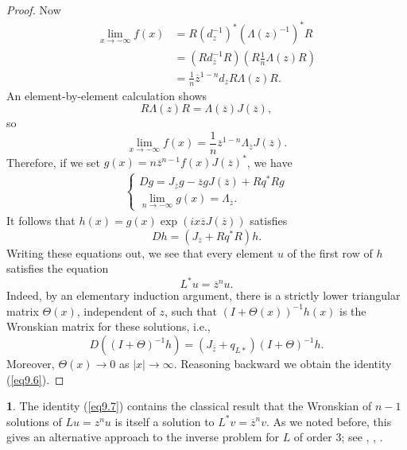 \documentclass{surv-l}
\theoremstyle{plain}
\theoremstyle{definition}
\newtheorem{remark}[theorem]{\sc{Remark}}
\numberwithin{equation}{chapter}
\begin{document}
\begin{proof}
Now
\begin{align*}
\lim_{x\rightarrow-\infty} f(x)& = R(d_{z}^{-1})^{*}(\Lambda(z)^{-1})^{*}R\\
&= (Rd_{\overline{z}}^{-1}R)(R\tfrac{1}{n}\Lambda(z)R)\\
&= \frac{1}{n}\overline{z}^{1-n}d_{\overline{z}}R\Lambda(z)R.
\end{align*}
An element-by-element calculation shows
\begin{equation}\label{eq9.13}
R\Lambda(z)R=\Lambda(\overline{z})J(\overline{z}),
\end{equation}
so
\begin{equation*}
\lim_{x\rightarrow-\infty}f(x) = \frac{1}{n}\overline{z}^{1-n}\Lambda_{\overline{z}}J(\overline{z}).
\end{equation*}
Therefore, if we set $g(x)=n\overline{z}^{n-1}f(x)J(\overline{z})^{*}$, we have
\begin{align}\label{eq9.14}
\left\{\begin{array}{ll}
Dg = J_{\overline{z}}g-\overline{z}gJ(\overline{z}) + Rq^{*} Rg\\
\lim_{n\rightarrow-\infty}g(x) = \Lambda_{\overline{z}}.
\end{array}\right.
\end{align}
It follows that $h(x)=g(x)\exp(ix\overline{z}J(\overline{z}))$ satisfies
\begin{equation}\label{eq9.15}
Dh=(J_{\overline{z}}+Rq^{*}R)h.
\end{equation}
Writing these equations out, we see that every element $u$ of the first row of $h$ satisfies the equation
\begin{equation*}
L^{*}u=\overline{z}^{n}u.
\end{equation*}
Indeed, by an elementary induction argument, there is a strictly lower triangular matrix $\Theta(x)$, independent of $z$, such that $(I+\Theta(x))^{-1}h(x)$ is the Wronskian matrix for these solutions, i.e.,
\begin{equation*}
D((I+\Theta)^{-1}h)=(J_{\overline{z}}+q_{{L}{*}})(I+\Theta)^{-1}h.
\end{equation*}
Moreover, $\Theta(x)\rightarrow 0$ as $|x|\rightarrow\infty$. Reasoning backward we obtain the identity (\ref{eq9.6}).
\end{proof}
\setcounter{theorem}{15}
\begin{remark}\label{rem9.16} The identity (\ref{eq9.7}) contains the classical result that the Wronskian of $n-1$ solutions of $Lu=z^{n}u$ is itself a solution to $L^{*}v=\overline{z}^{n}v$. As we noted before, this gives an alternative approach to the inverse problem for $L$ of order 3; see \cite{Ka}, \cite{McK}, \cite{DTT}.
\end{remark}
\end{document}
